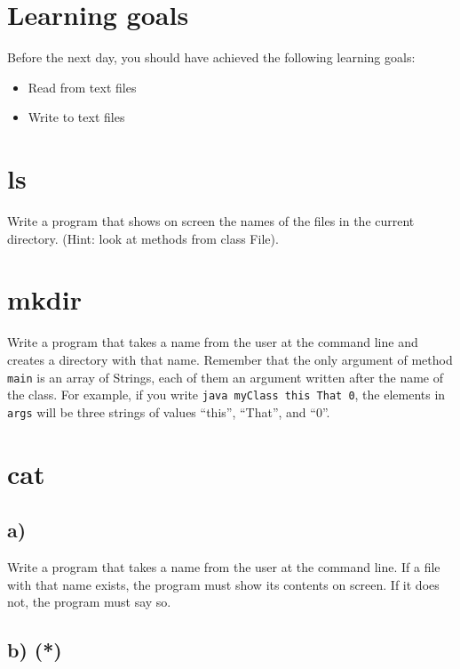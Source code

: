 \documentclass{article}
\begin{document}
\section*{Learning goals}
\label{sec:learning-goals}

Before the next day, you should have achieved the following learning
goals: 

\begin{itemize}
\item Read from text files
\item Write to text files
\end{itemize}

\section{ls}
\label{sec:ls}

Write a program that shows on screen the names of the files in the
current directory. (Hint: look at methods from class File). 

\section{mkdir}
\label{sec:mkdir}

Write a program that takes a name from the user at the command line
and creates a directory with that name. Remember that the only
argument of method \verb+main+ is an array of Strings, each of them
an argument written after the name of the class. For example, if you
write \verb+java myClass this That 0+, the elements in \verb+args+
will be three strings of values ``this'', ``That'', and ``0''. 

\section{cat}
\label{sec:cat}

\subsection*{a) }

Write a program that takes a name from the user at the command
line. If a file with that name exists, the program must show its
contents on screen. If it does not, the program must say so. 

\subsection*{b) (*)}
\label{sec:b}
\end{document}
